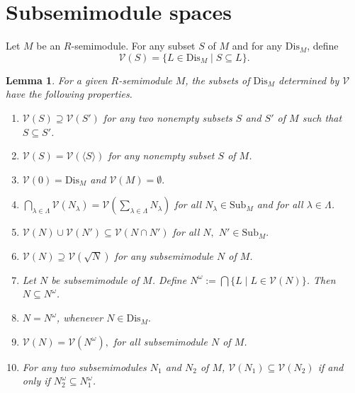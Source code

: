 \documentclass[12pt,english]{smfart}
\newtheorem{lemma}[theorem]{Lemma}
\theoremstyle{definition}
\begin{document}
\section{Subsemimodule spaces}\label{ssms}

Let $M$ be an $R$-semimodule. For any subset $S$ of $M$ and for any $\mathrm{Dis}_M$, define
\begin{equation}\label{vsl}
\mathcal{V}(S)=\{L\in \mathrm{Dis}_M\mid S\subseteq L\}.	
\end{equation} 

\begin{lemma}\label{bpvs}
For a given $R$-semimodule $M$, the subsets of $\mathrm{Dis}_M$ determined by $\mathcal{V}$ have the following properties.
\begin{enumerate}[\upshape (1)]
	
\item $\mathcal{V}(S)\supseteq \mathcal{V}(S')$ for any two nonempty subsets $S$ and $S'$ of $M$ such that $S\subseteq S'$.
	
\item\label{vsvs} $\mathcal{V}(S)=\mathcal{V}(\langle S \rangle)$ for any nonempty subset $S$ of $M$.	
	
\item  \label{a} $\mathcal{V}(0)=\mathrm{Dis}_M$ and $\mathcal{V}(M)=\emptyset.$

\item \label{b} $\bigcap_{\lambda\in \Lambda}\mathcal{V}(N_{\lambda})=\mathcal{V}\left( \sum_{\lambda \in \Lambda} N_{\lambda}\right)$ for all $N_{\lambda}\in \mathrm{Sub}_M$ and for all $\lambda\in \Lambda$.

\item\label{vnuvn} $\mathcal{V}(N)\cup \mathcal{V}(N') \subseteq \mathcal{V}(N\cap N')$ for all $N,$ $N'\in \mathrm{Sub}_M.$

\item\label{vnsvn} $\mathcal{V}(N)\supseteq \mathcal{V}(\sqrt{N})$ for any subsemimodule $N$ of $M$.

\item\label{axaa} Let $N$ be subsemimodule of $M$. Define $ N^{\omega}:=\bigcap\{L\mid L\in \mathcal{V}(N)\}$. Then $N\subseteq N^{\omega}$.

\item \label{axa}   
$N=N^{\omega}$, whenever $N\in\mathrm{Dis}_M.$

\item \label{hahxa}  $\mathcal{V}(N)=\mathcal{V}(N^{\omega}),$ for all subsemimodule $N$ of $M$.

\item\label{xbxa} For any two subsemimodules $N_1$ and $N_2$ of $M$, $\mathcal{V}(N_1)\subseteq \mathcal{V}(N_2)$ if and only if $N_2^{\omega}\subseteq N_1^{\omega}$.
\end{enumerate}
\end{lemma}
\end{document}
